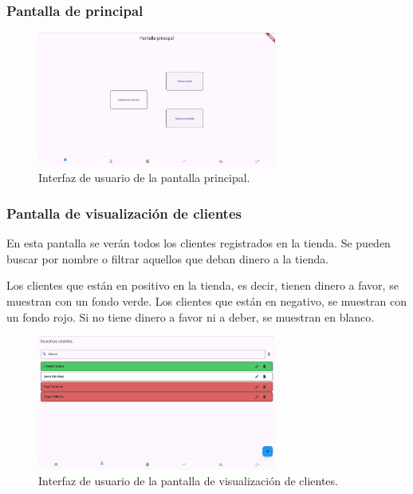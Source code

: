 \subsubsection{Pantalla de principal}

\begin{figure}[H]
	\centering
	\includegraphics[width=0.7\textwidth]{imagenes/PrimeraIteracion/pantallaPrincipal.png}
	\caption{Interfaz de usuario de la pantalla principal.}
	\label{fig:appPantallaPrincipal}
\end{figure}

\subsubsection{Pantalla de visualización de clientes}

En esta pantalla se verán todos los clientes registrados en la tienda. Se pueden buscar por nombre o filtrar aquellos que deban dinero a la tienda. 

Los clientes que están en positivo en la tienda, es decir, tienen dinero a favor, se muestran con un fondo verde. Los clientes que están en negativo, se muestran con un fondo rojo. Si no tiene dinero a favor ni a deber, se muestran en blanco. 

\begin{figure}[H]
	\centering
	\includegraphics[width=0.7\textwidth]{imagenes/PrimeraIteracion/visualizacionClientes.png}
	\caption{Interfaz de usuario de la pantalla de visualización de clientes.}
	\label{fig:appVisualizarClientes}
\end{figure}

